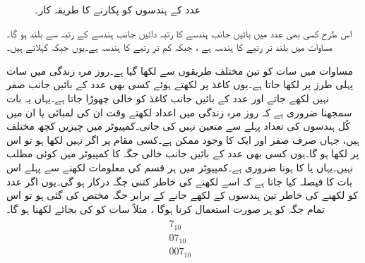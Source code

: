 \begin{figure}
\centering
\begin{subfigure}{0.45\textwidth}
\centering
{}
\end{subfigure}\hfill
\begin{subfigure}{0.45\textwidth}
\centering
{}
\end{subfigure}
\caption{عدد کے ہندسوں کو پکارنے کا طریقہ کار۔}
\label{شکل_ثنائی_ہندسوں_کے_نام}
\end{figure}

	اس طرح کسی بھی عدد میں بائیں جانب ہندسے کا رتبہ دائیں جانب ہندسے کے رتبہ سے بلند ہو گا۔مساوات  میں بلند تر رتبے کا ہندسہ  ہے ، جبکہ کم تر رتبے کا ہندسہ ہے۔یوں   جبکہ   کہلاتے ہیں۔
	
	مساوات  میں سات کو تین مختلف طریقوں سے لکھا گیا ہے۔روز مرہ زندگی میں سات پہلی طرز پر لکھا جاتا ہے۔یوں کاغذ پر لکھتے ہوئے کسی بھی عدد کے بائیں جانب صفر نہیں لکھے جاتے اور عدد کے بائیں جانب کاغذ کو خالی چھوڑا جاتا ہے۔یہاں یہ بات سمجھنا ضروری ہے کہ روز مرہ زندگی میں اعداد لکھتے وقت ان کی لمبائی یا ان میں کُل ہندسوں کی تعداد پہلے سے متعین نہیں کی جاتی۔کمپیوٹر میں چیزیں کچھ مختلف ہیں، جہاں صرف صفر  اور ایک  کا وجود ممکن ہے۔کسی مقام پر اگر  نہیں لکھا ہو تو اس پر  لکھا ہو گا۔یوں کسی بھی عدد کے بائیں جانب خالی جگہ کا کمپیوٹر میں کوئی مطلب نہیں۔یہاں  یا  کا ہونا ضروری ہے۔کمپیوٹر میں ہر قسم کی معلومات لکھنے سے پہلے اس بات کا فیصلہ کیا جاتا ہے کہ اسے لکھنے کی خاطر کتنی جگہ درکار ہو گی۔یوں اگر عدد کو لکھنے کی خاطر تین ہندسوں کے لکھے جانے کے برابر جگہ مختص کی گئی ہو تو اس تمام جگہ کو ہر صورت استعمال کرنا ہوگا ، مثلاً سات کو  کی بجائے  لکھنا ہو گا۔
\begin{gather}
\begin{aligned}\label{مساوات_ثنائی_ہندسوں}
7_{10} &\\
07_{10}&\\
007_{10}&
\end{aligned}
\end{gather}

